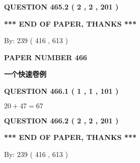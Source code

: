\documentclass{ctexart}
\begin{document}
 
  
\vspace{0.2in}
  
{\textbf{\Large{QUESTION
465.2 
 ( 2 , 2 , 201 )
}}}
  
  
   
   
 \vspace{0.2in}
 
   
   
   
   
\vspace{1.0in} 
{\textbf{\large{ *** END OF PAPER, THANKS *** }}} 
   
   
\hspace{1.0in} By: 
 239 ( 416 ,  613 )
   
   
   
   
\newpage 
\setcounter{page}{ 
   466001 } 
   
   
   
   
 {\textbf{ \Large{ PAPER NUMBER  466  }}}
   
   
\vspace{0.2in}
   
   
   
   
   
   
 \vspace{0.2in}
{\LARGE {\textbf{ 一个快速卷例}}}
   
   
  
\vspace{0.2in}
  
{\textbf{\Large{QUESTION
466.1 
 ( 1 , 1 , 101 )
}}}
  
  
 
 

$ %
20 +  %
47=   %
67$
 
 
  
\vspace{0.2in}
  
{\textbf{\Large{QUESTION
466.2 
 ( 2 , 2 , 201 )
}}}
  
  
   
   
 \vspace{0.2in}
 
   
   
   
   
\vspace{1.0in} 
{\textbf{\large{ *** END OF PAPER, THANKS *** }}} 
   
   
\hspace{1.0in} By: 
 239 ( 416 ,  613 )
   
\end{document}
